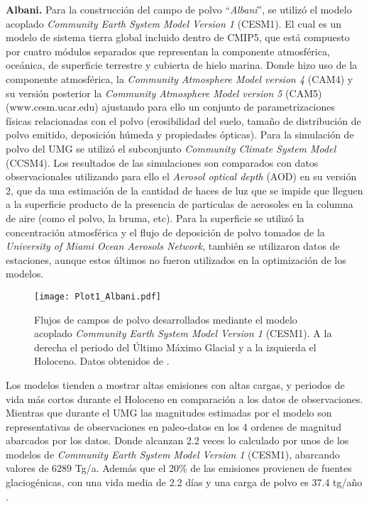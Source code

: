 {\bf Albani.} Para la construcción del campo de polvo ``\textit{Albani}'', se utilizó el modelo acoplado \textit{Community Earth System Model Version 1} (CESM1). El cual es un modelo de sistema tierra global incluido dentro de CMIP5, que está compuesto por cuatro módulos separados que representan la componente atmosférica, oceánica, de superficie terrestre y cubierta de hielo marina. Donde \citep{albani2014improved} hizo uso de la componente atmosférica, la \textit{Community Atmosphere Model version 4} (CAM4) y su versión posterior la \textit{Community Atmosphere Model version 5} (CAM5) (www.cesm.ucar.edu) ajustando para ello un conjunto de parametrizaciones físicas relacionadas con el polvo (erosibilidad del suelo, tamaño de distribución de polvo emitido, deposición húmeda y propiedades ópticas). Para la simulación de polvo del UMG se utilizó el subconjunto \textit{ Community Climate System Model} (CCSM4). Los resultados de las simulaciones son comparados con datos observacionales utilizando para ello el \textit{Aerosol optical depth} (AOD) en su versión 2, que da una estimación de la cantidad de haces de luz que se impide que lleguen a la superficie producto de la presencia de particulas de aerosoles en la columna de aire (como el polvo, la bruma, etc). Para la superficie se utilizó la concentración atmosférica y el flujo de deposición de polvo tomados de la \textit{University of Miami Ocean Aerosols Network}, también se utilizaron datos de estaciones, aunque estos últimos no fueron utilizados en la optimización de los modelos. 

\begin{figure}[H]
\centering
  \texttt{[image: Plot1\_Albani.pdf]}
  \caption[Flujos de polvo \cite{albani2014improved}]{Flujos de campos de polvo desarrollados mediante el modelo acoplado \textit{Community Earth System Model Version 1} (CESM1).  A la derecha el periodo del Último Máximo Glacial y a la izquierda el Holoceno. Datos obtenidos de \cite{albani2014improved}.}
  \label{fig:Albani}
\end{figure}

Los modelos tienden a mostrar altas emisiones con altas cargas, y periodos de vida más cortos durante el Holoceno en comparación a los datos de observaciones. Mientras que durante el UMG las magnitudes estimadas por el modelo son representativas de observaciones en paleo-datos en los 4 ordenes de magnitud abarcados por los datos. Donde alcanzan 2.2 veces lo calculado por unos de los modelos de 
\textit{Community Earth System Model Version 1} (CESM1), abarcando valores de $6289$ Tg/a. Además que el 20\% de las emisiones provienen de fuentes glaciogénicas, con una vida media de 2.2 días y una carga de polvo es 37.4 tg/año \citep{albani2014improved}. 


